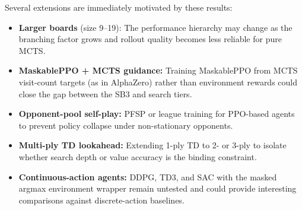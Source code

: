 \documentclass[conference]{IEEEtran}
\begin{document}
Several extensions are immediately motivated by these results:
\begin{itemize}
  \item \textbf{Larger boards} (size 9–19): The performance hierarchy may
    change as the branching factor grows and rollout quality becomes less reliable
    for pure MCTS.
  \item \textbf{MaskablePPO + MCTS guidance:} Training MaskablePPO from MCTS
    visit-count targets (as in AlphaZero) rather than environment rewards could
    close the gap between the SB3 and search tiers.
  \item \textbf{Opponent-pool self-play:} PFSP or league training for PPO-based
    agents to prevent policy collapse under non-stationary opponents.
  \item \textbf{Multi-ply TD lookahead:} Extending 1-ply TD to 2- or 3-ply to
    isolate whether search depth or value accuracy is the binding constraint.
  \item \textbf{Continuous-action agents:} DDPG, TD3, and SAC with the masked
    argmax environment wrapper remain untested and could provide interesting
    comparisons against discrete-action baselines.
\end{itemize}
\end{document}

